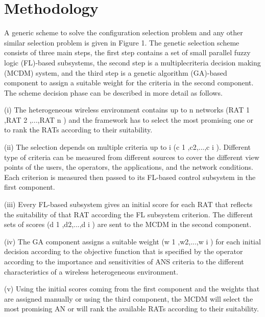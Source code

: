 \section{Methodology} \label{sec:Approach}


A generic scheme to solve the configuration selection problem and any other similar selection problem is given in Figure 1.
The genetic selection scheme consists of three main steps,
	the first step contains a set of small parallel fuzzy logic (FL)-based subsystems,
	the second step is a multiplecriteria decision making (MCDM) system,
	and the third step is a genetic algorithm (GA)-based component to assign a suitable weight for the criteria in the second component.
The scheme decision phase can be described in more detail as follows.





(i) The heterogeneous wireless environment contains up to n networks (RAT 1 ,RAT 2 ,...,RAT n ) and the framework has to select the most promising one or to rank the RATs according to their suitability.

(ii) The selection depends on multiple criteria up to i (c 1 ,c2,...,c i ).
Different type of criteria can be measured from different sources to cover the different view points of the users,
	the operators,
	the applications,
	and the network conditions.
Each criterion is measured then passed to its FL-based control subsystem in the first component.

(iii) Every FL-based subsystem gives an initial score for each RAT that reflects the suitability of that RAT according the FL subsystem criterion.
The different sets of scores (d 1 ,d2,...,d i ) are sent to the MCDM in the second component.

(iv) The GA component assigns a suitable weight (w 1 ,w2,...,w i ) for each initial decision according to the objective function that is specified by the operator according to the importance and sensitivities of ANS criteria to the different characteristics of a wireless heterogeneous environment.

(v) Using the initial scores coming from the first component and the weights that are assigned manually or using the third component,
	the MCDM will select the most promising AN or will rank the available RATs according to their suitability.


